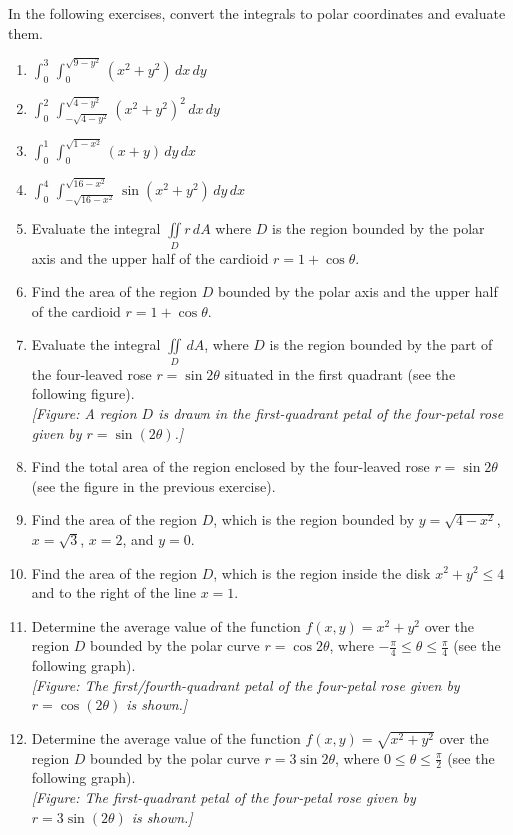 \documentclass{exercises}
\begin{document}
In the following exercises, convert the integrals to polar coordinates and evaluate them.

\begin{enumerate}[resume]
\item $\int_{0}^{3}\,\int_{0}^{\sqrt{9-y^{2}}}(x^{2}+y^{2})\,dx\,dy$
\item $\int_{0}^{2}\,\int_{-\sqrt{4-y^{2}}}^{\sqrt{4-y^{2}}}{(x^{2}+y^{2})}^{2}\,dx\,dy$
\item $\int_{0}^{1}\,\int_{0}^{\sqrt{1-x^{2}}}(x+y)\,dy\,dx$
\item $\int_{0}^{4}\,\int_{-\sqrt{16-x^{2}}}^{\sqrt{16-x^{2}}}\sin(x^{2}+y^{2})\,dy\,dx$
\item Evaluate the integral $\underset{D}{\iint}r\,dA$ where $D$ is the region bounded by the polar axis and the upper half of the cardioid $r=1+\cos \theta$.
\item Find the area of the region $D$ bounded by the polar axis and the upper half of the cardioid $r=1+\cos \theta$.
\item Evaluate the integral $\underset{D}{\iint}\,dA$, where $D$ is the region bounded by the part of the four-leaved rose $r=\sin 2\theta$ situated in the first quadrant (see the following figure). \\ \textit{[Figure: A region $D$ is drawn in the first-quadrant petal of the four-petal rose given by $r=\sin(2\theta)$.]}
\item Find the total area of the region enclosed by the four-leaved rose $r=\sin 2\theta$ (see the figure in the previous exercise).
\item Find the area of the region $D$, which is the region bounded by $y=\sqrt{4-x^{2}}$, $x=\sqrt{3}$, $x=2$, and $y=0$.
\item Find the area of the region $D$, which is the region inside the disk $x^{2}+y^{2}\le4$ and to the right of the line $x=1$.
\item Determine the average value of the function $f(x,y)=x^{2}+y^{2}$ over the region $D$ bounded by the polar curve $r=\cos 2\theta$, where $-\frac{\pi}{4}\le \theta \le \frac{\pi}{4}$ (see the following graph). \\ \textit{[Figure: The first/fourth-quadrant petal of the four-petal rose given by $r=\cos(2\theta)$ is shown.]}
\item Determine the average value of the function $f(x,y)=\sqrt{x^{2}+y^{2}}$ over the region $D$ bounded by the polar curve $r=3\sin 2\theta$, where $0\le \theta \le \frac{\pi}{2}$ (see the following graph). \\ \textit{[Figure: The first-quadrant petal of the four-petal rose given by $r=3\sin(2\theta)$ is shown.]}

\end{enumerate}
\end{document}
